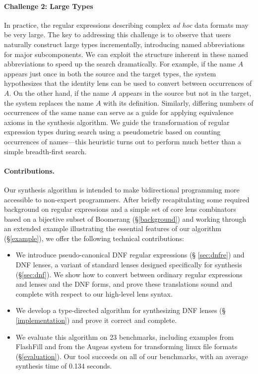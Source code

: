 \documentclass[numbers,10pt,preprint\ifanon ,nocopyrightspace\fi]{sigplanconf}
\begin{document}
\paragraph*{Challenge 2: Large Types}
In practice, the regular expressions describing complex {\em ad hoc} data
formats may be very large.  
%
The key to addressing this challenge is to observe that users naturally
construct large types incrementally, introducing named abbreviations for
major subcomponents.  We can exploit the structure inherent in these named
abbreviations to speed up the search dramatically.  For example, if the name
$A$ appears just once in both the source and the target types, the system
hypothesizes that the identity lens can be used to convert between
occurrences of $A$.  On the other hand, if the name $A$ appears in the
source but not in the target, the system replaces the name $A$ with its
definition.  Similarly, differing numbers of occurrences of the same name
can serve as a guide for applying equivalence axioms in the synthesis
algorithm.  We guide the transformation of regular expression types during
search using a pseudometric based on counting occurrences of names---this
heuristic turns out to perform much better than a simple breadth-first
search.

\paragraph*{Contributions.}  Our synthesis algorithm is intended to make
bidirectional programming more accessible to non-expert programmers.  After
briefly recapitulating some required background on regular expressions and a
simple set of core lens combinators based on a bijective subset of Boomerang
(\S\ref{background}) and working through an extended example illustrating
the essential features of our algorithm (\S\ref{example}), we offer the
following technical contributions:

\begin{itemize}
\item We introduce pseudo-canonical DNF regular expressions (\S
\ref{sec:dnfre}) and DNF lenses, a variant of standard lenses designed
specifically for synthesis (\S \ref{sec:dnf}).  We show how to convert
between ordinary regular expressions and lenses and the DNF forms, and prove
these translations sound and complete with respect to our high-level lens syntax.
\item We develop a type-directed algorithm for synthesizing DNF lenses (\S
\ref{implementation}) and prove it correct and complete.
\item We evaluate this algorithm on 23 benchmarks, including examples from
FlashFill and from the Augeas system for
transforming linux file formats (\S \ref{evaluation}).  Our tool succeeds on
all of our benchmarks, with an average synthesis time of 0.134
seconds.
\end{itemize}
\end{document}
